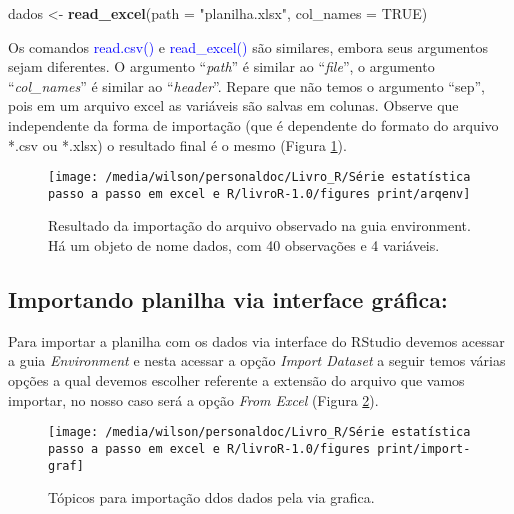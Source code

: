 \documentclass[14pt,titlepage, oneside, openany, a4paper]{book}
\newenvironment{Shaded}{\begin{snugshade}}{\end{snugshade}}
\newcommand{\DataTypeTok}[1]{\textcolor[rgb]{0.13,0.29,0.53}{#1}}
\newcommand{\KeywordTok}[1]{\textcolor[rgb]{0.13,0.29,0.53}{\textbf{#1}}}
\newcommand{\NormalTok}[1]{#1}
\newcommand{\OtherTok}[1]{\textcolor[rgb]{0.56,0.35,0.01}{#1}}
\newcommand{\StringTok}[1]{\textcolor[rgb]{0.31,0.60,0.02}{#1}}
\begin{document}
\begin{Shaded}
\begin{Highlighting}[]
\NormalTok{dados <-}\StringTok{ }\KeywordTok{read_excel}\NormalTok{(}\DataTypeTok{path =} \StringTok{"planilha.xlsx"}\NormalTok{, }\DataTypeTok{col_names =} \OtherTok{TRUE}\NormalTok{)}
\end{Highlighting}
\end{Shaded}

Os comandos \textcolor{blue}{read.csv()} e \textcolor{blue}{read\_excel()} são similares, embora seus argumentos sejam diferentes. O argumento ``\emph{path}'' é similar ao ``\emph{file}'', o argumento ``\emph{col\_names}'' é similar ao ``\emph{header}''. Repare que não temos o argumento ``sep'', pois em um arquivo excel as variáveis são salvas em colunas. Observe que independente da forma de importação (que é dependente do formato do arquivo *.csv ou *.xlsx) o resultado final é o mesmo (Figura \ref{fig:arqenv}).

\begin{figure}[H]

{\centering \texttt{[image: /media/wilson/personaldoc/Livro\_R/Série estatística passo a passo em excel e R/livroR-1.0/figures print/arqenv]} 

}

\caption{Resultado da importação do arquivo observado na guia environment. Há um objeto de nome dados, com 40 observações e 4 variáveis.}\label{fig:arqenv}
\end{figure}

\hypertarget{importando-planilha-via-interface-gruxe1fica}{%
\subsection{Importando planilha via interface gráfica:}\label{importando-planilha-via-interface-gruxe1fica}}

Para importar a planilha com os dados via interface do RStudio devemos acessar a guia \emph{Environment} e nesta acessar a opção \emph{Import Dataset} a seguir temos várias opções a qual devemos escolher referente a extensão do arquivo que vamos importar, no nosso caso será a opção \emph{From Excel} (Figura \ref{fig:import-graf}).

\begin{figure}[H]

{\centering \texttt{[image: /media/wilson/personaldoc/Livro\_R/Série estatística passo a passo em excel e R/livroR-1.0/figures print/import-graf]} 

}

\caption{Tópicos para importação ddos dados pela via grafica.}\label{fig:import-graf}
\end{figure}
\end{document}
